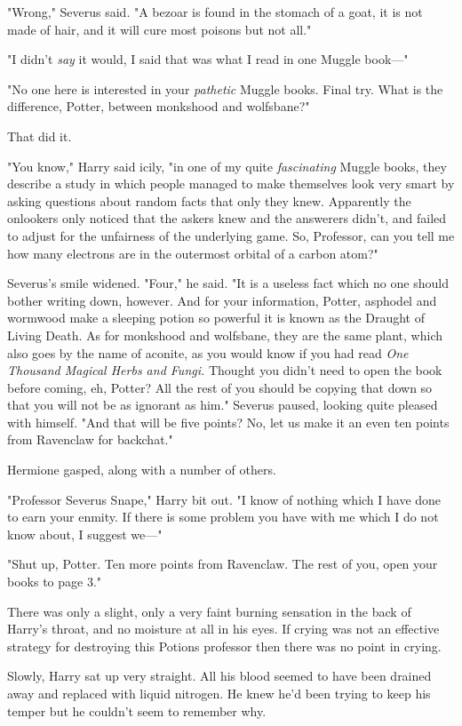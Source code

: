 "Wrong," Severus said. "A bezoar is found in the stomach of a goat, it is not
made of hair, and it will cure most poisons but not all."

"I didn't \emph{say} it would, I said that was what I read in one Muggle
book---"

"No one here is interested in your \emph{pathetic} Muggle books. Final try.
What is the difference, Potter, between monkshood and wolfsbane?"

That did it.

"You know," Harry said icily, "in one of my quite \emph{fascinating} Muggle
books, they describe a study in which people managed to make themselves look
very smart by asking questions about random facts that only they knew.
Apparently the onlookers only noticed that the askers knew and the answerers
didn't, and failed to adjust for the unfairness of the underlying game. So,
Professor, can you tell me how many electrons are in the outermost orbital of a
carbon atom?"

Severus's smile widened. "Four," he said. "It is a useless fact which no one
should bother writing down, however. And for your information, Potter, asphodel
and wormwood make a sleeping potion so powerful it is known as the Draught of
Living Death. As for monkshood and wolfsbane, they are the same plant, which
also goes by the name of aconite, as you would know if you had read \emph{One
Thousand Magical Herbs and Fungi.} Thought you didn't need to open the book
before coming, eh, Potter? All the rest of you should be copying that down so
that you will not be as ignorant as him." Severus paused, looking quite pleased
with himself. "And that will be{\el} five points? No, let us make it an even
ten points from Ravenclaw for backchat."

Hermione gasped, along with a number of others.

"Professor Severus Snape," Harry bit out. "I know of nothing which I have done
to earn your enmity. If there is some problem you have with me which I do not
know about, I suggest we\mbox{---}"

"Shut up, Potter. Ten more points from Ravenclaw. The rest of you, open your
books to page 3."

There was only a slight, only a very faint burning sensation in the back of
Harry's throat, and no moisture at all in his eyes. If crying was not an
effective strategy for destroying this Potions professor then there was no
point in crying.

Slowly, Harry sat up very straight. All his blood seemed to have been drained
away and replaced with liquid nitrogen. He knew he'd been trying to keep his
temper but he couldn't seem to remember why.

